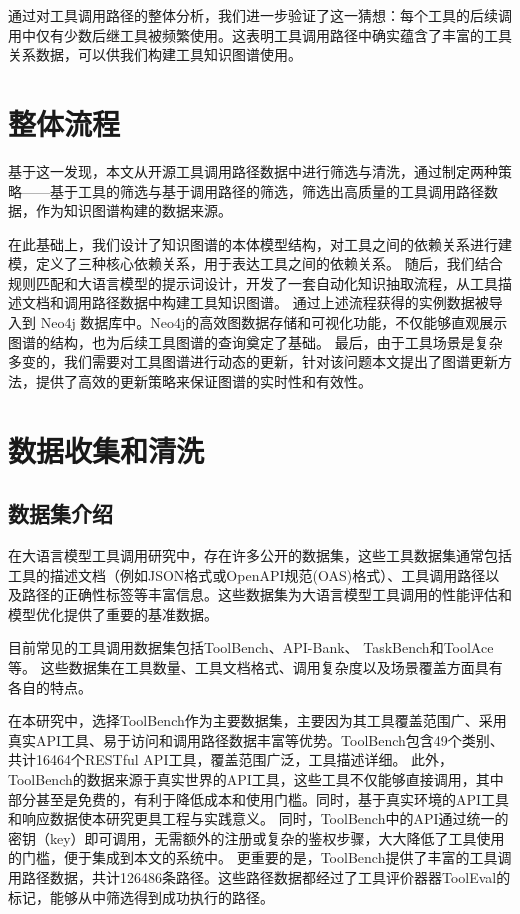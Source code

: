 通过对工具调用路径的整体分析，我们进一步验证了这一猜想：每个工具的后续调用中仅有少数后继工具被频繁使用。这表明工具调用路径中确实蕴含了丰富的工具关系数据，可以供我们构建工具知识图谱使用。

\section{整体流程}

基于这一发现，本文从开源工具调用路径数据中进行筛选与清洗，通过制定两种策略——基于工具的筛选与基于调用路径的筛选，筛选出高质量的工具调用路径数据，作为知识图谱构建的数据来源。

在此基础上，我们设计了知识图谱的本体模型结构，对工具之间的依赖关系进行建模，定义了三种核心依赖关系，用于表达工具之间的依赖关系。
随后，我们结合规则匹配和大语言模型的提示词设计，开发了一套自动化知识抽取流程，从工具描述文档和调用路径数据中构建工具知识图谱。
通过上述流程获得的实例数据被导入到 Neo4j 数据库中。Neo4j的高效图数据存储和可视化功能，不仅能够直观展示图谱的结构，也为后续工具图谱的查询奠定了基础。
最后，由于工具场景是复杂多变的，我们需要对工具图谱进行动态的更新，针对该问题本文提出了图谱更新方法，提供了高效的更新策略来保证图谱的实时性和有效性。

\section{数据收集和清洗}

\subsection{数据集介绍}

在大语言模型工具调用研究中，存在许多公开的数据集，这些工具数据集通常包括工具的描述文档（例如JSON格式\cite{Qin2023}或OpenAPI规范(OAS)\cite{Song2023}格式）、工具调用路径\cite{Qin2023, liu2024toolace}以及路径的正确性标签等丰富信息。这些数据集为大语言模型工具调用的性能评估和模型优化提供了重要的基准数据。

\sloppy
目前常见的工具调用数据集包括ToolBench\cite{Qin2023}、API-Bank\cite{Li2023c}、
TaskBench\cite{shen2023taskbench}和ToolAce\cite{liu2024toolace}等。
这些数据集在工具数量、工具文档格式、调用复杂度以及场景覆盖方面具有各自的特点。
\relax

在本研究中，选择ToolBench作为主要数据集，主要因为其工具覆盖范围广、采用真实API工具、易于访问和调用路径数据丰富等优势。ToolBench包含49个类别、共计16464个RESTful API工具，覆盖范围广泛，工具描述详细。
此外，ToolBench的数据来源于真实世界的API工具，这些工具不仅能够直接调用，其中部分甚至是免费的，有利于降低成本和使用门槛。同时，基于真实环境的API工具和响应数据使本研究更具工程与实践意义。
同时，ToolBench中的API通过统一的密钥（key）即可调用，无需额外的注册或复杂的鉴权步骤，大大降低了工具使用的门槛，便于集成到本文的系统中。
更重要的是，ToolBench提供了丰富的工具调用路径数据，共计126486条路径。这些路径数据都经过了工具评价器器ToolEval\cite{Qin2023}的标记，能够从中筛选得到成功执行的路径。

